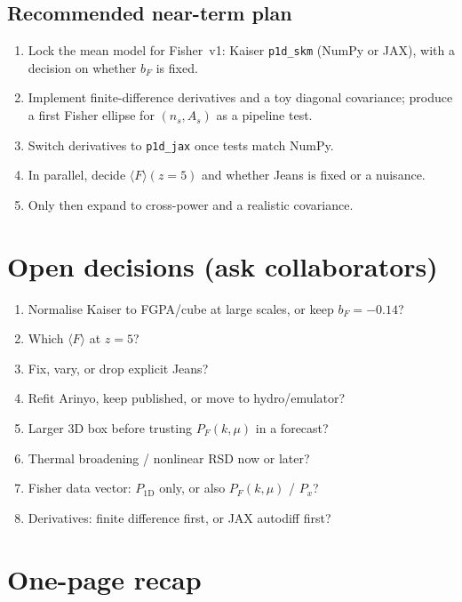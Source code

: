 \documentclass[11pt]{article}
\begin{document}
\subsection{Recommended near-term plan}

\begin{enumerate}
\item Lock the mean model for Fisher~v1: Kaiser \texttt{p1d\_skm} (NumPy or JAX), with a decision on whether $b_F$ is fixed.
\item Implement finite-difference derivatives and a toy diagonal covariance; produce a first Fisher ellipse for $(n_s,A_s)$ as a pipeline test.
\item Switch derivatives to \texttt{p1d\_jax} once tests match NumPy.
\item In parallel, decide $\langle F\rangle(z=5)$ and whether Jeans is fixed or a nuisance.
\item Only then expand to cross-power and a realistic covariance.
\end{enumerate}

\section{Open decisions (ask collaborators)}

\begin{enumerate}
\item Normalise Kaiser to FGPA/cube at large scales, or keep $b_F=-0.14$?
\item Which $\langle F\rangle$ at $z=5$?
\item Fix, vary, or drop explicit Jeans?
\item Refit Arinyo, keep published, or move to hydro/emulator?
\item Larger 3D box before trusting $P_F(k,\mu)$ in a forecast?
\item Thermal broadening / nonlinear RSD now or later?
\item Fisher data vector: $P_{1\mathrm{D}}$ only, or also $P_F(k,\mu)$ / $P_x$?
\item Derivatives: finite difference first, or JAX autodiff first?
\end{enumerate}

\section{One-page recap}
\end{document}
